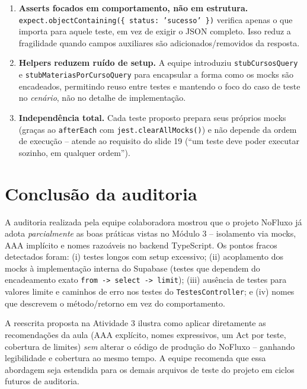 \documentclass[12pt,a4paper]{article}
\begin{document}
\begin{enumerate}[leftmargin=1.5em]
\item \textbf{Asserts focados em comportamento, não em estrutura.}
\texttt{expect.objectContaining(\{ status: 'sucesso' \})} verifica
apenas o que importa para aquele teste, em vez de exigir o JSON
completo.  Isso reduz a fragilidade quando campos auxiliares são
adicionados/removidos da resposta.

\item \textbf{Helpers reduzem ruído de setup.} A equipe introduziu
\texttt{stubCursosQuery} e \texttt{stubMateriasPorCursoQuery} para
encapsular a forma como os mocks são encadeados, permitindo reuso
entre testes e mantendo o foco do caso de teste no \emph{cenário},
não no detalhe de implementação.

\item \textbf{Independência total.} Cada teste proposto prepara seus
próprios mocks (graças ao \texttt{afterEach} com
\texttt{jest.clearAllMocks()}) e não depende da ordem de execução --
atende ao requisito do slide 19 (``um teste deve poder executar
sozinho, em qualquer ordem'').

\end{enumerate}

\section*{Conclusão da auditoria}

A auditoria realizada pela equipe colaboradora mostrou que o projeto
NoFluxo já adota \emph{parcialmente} as boas práticas vistas no
Módulo 3 -- isolamento via mocks, AAA implícito e nomes razoáveis no
backend TypeScript. Os pontos fracos detectados foram:
(i) testes longos com setup excessivo;
(ii) acoplamento dos mocks à implementação interna do Supabase
(testes que dependem do encadeamento exato \texttt{from -> select -> limit});
(iii) ausência de testes para valores limite e caminhos de erro nos
testes do \texttt{TestesController}; e
(iv) nomes que descrevem o método/retorno em vez do comportamento.

A reescrita proposta na Atividade 3 ilustra como aplicar diretamente
as recomendações da aula (AAA explícito, nomes expressivos, um Act
por teste, cobertura de limites) \emph{sem} alterar o código de
produção do NoFluxo -- ganhando legibilidade e cobertura ao mesmo
tempo. A equipe recomenda que essa abordagem seja estendida para os
demais arquivos de teste do projeto em ciclos futuros de auditoria.
\end{document}

